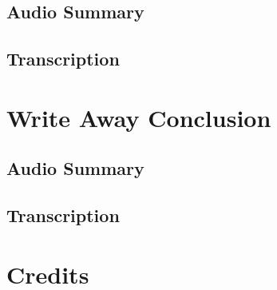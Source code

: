 \subsection{Audio Summary}

\subsection{Transcription}

\section{Write Away Conclusion}

\subsection{Audio Summary}

\subsection{Transcription}

\section{Credits}